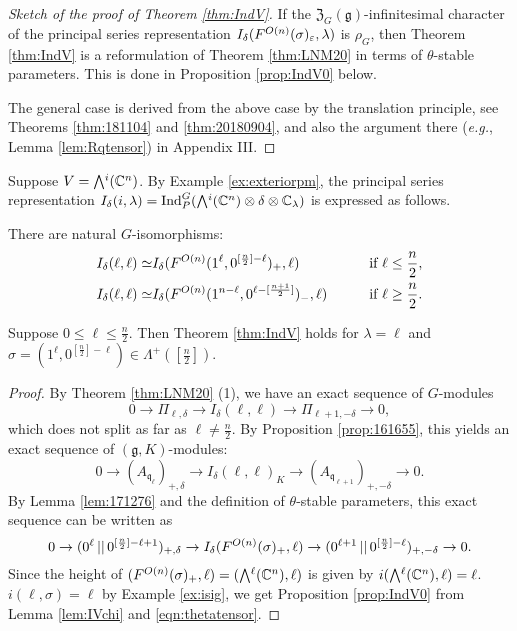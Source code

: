 \begin{proof}
[Sketch of the proof of Theorem \ref{thm:IndV}]
If the ${\mathfrak{Z}}_G({\mathfrak{g}})$-infinitesimal character
 of the principal series representation
 $I_{\delta}(F^{{O(n)}}({\sigma})_{\varepsilon}, \lambda)$ 
 is $\rho_G$, 
 then Theorem \ref{thm:IndV} is a reformulation of Theorem \ref{thm:LNM20}
 in terms of $\theta$-stable parameters.  
This is done in Proposition \ref{prop:IndV0} below.  



The general case is derived from the above case by the translation principle, 
 see Theorems \ref{thm:181104} and \ref{thm:20180904}, 
 and also the argument there
 ({\it{e.g.}}, Lemma \ref{lem:Rqtensor}) in Appendix III.  
\end{proof}
Suppose $V=\Exterior^i({\mathbb{C}}^n)$.  
By Example \ref{ex:exteriorpm}, 
the principal series representation 
 $I_{\delta}(i,\lambda)={\operatorname{Ind}}_P^G(\Exterior^i({\mathbb{C}}^n) \otimes \delta \otimes {\mathbb{C}}_{\lambda})$
 is expressed as follows.  
\begin{lemma}
\label{lem:171276}
There are natural $G$-isomorphisms:
\begin{alignat*}{2}
I_{\delta}(\ell,\ell) 
\simeq & 
I_{\delta}(F^{{O(n)}}({1^\ell, 0^{[\frac n 2]-\ell}})_+,\ell)
&& \text{if $\ell \le \frac n 2$}, 
\\
I_{\delta}(\ell,\ell) 
\simeq & 
I_{\delta}(F^{{O(n)}}({1^{n-\ell}, 0^{\ell-[\frac {n+1} 2]}})_-,\ell)
\qquad
&& \text{if $\ell \ge \frac n 2$}.  
\end{alignat*}
\end{lemma}





\begin{proposition}
\label{prop:IndV0}
Suppose $0 \le \ell \le \frac n 2$.  
Then Theorem \ref{thm:IndV} holds for $\lambda=\ell$ 
 and $\sigma = (1^\ell, 0^{[\frac n 2]-\ell}) \in \Lambda^+([\frac n 2])$.  
\end{proposition}
\begin{proof}
By Theorem \ref{thm:LNM20} (1), 
 we have an exact sequence of $G$-modules
\[
   0 \to \Pi_{\ell,\delta} \to I_{\delta}(\ell,\ell) \to \Pi_{\ell+1,-\delta} \to 0, 
\]
which does not split as far as $\ell \ne \frac n 2$.  
By Proposition \ref{prop:161655}, 
 this yields an exact sequence of $({\mathfrak {g}}, K)$-modules:
\[
  0 \to (A_{{\mathfrak {q}}_\ell})_{+,\delta}
    \to I_{\delta}(\ell,\ell)_K
    \to (A_{{\mathfrak {q}}_{\ell+1}})_{+,-\delta}
    \to 0.  
\]
By Lemma \ref{lem:171276} and the definition of $\theta$-stable parameters,
 this exact sequence can be written as
\[
  0 \to 
  ({0^\ell}\,||\,{0^{[\frac n 2]-\ell+1}})_{+,\delta}
  \to 
  I_{\delta}(F^{{O(n)}}({\sigma})_+,\ell)
  \to
  ({0^{\ell+1}}\,||\,{0^{[\frac n 2]-\ell}})_{+,-\delta}
  \to 0.  
\]
Since the height of $(\Kirredrep{O(n)}{\sigma}_+,\ell)=(\Exterior^{\ell}({\mathbb{C}}^n),\ell)$
 is given by $i(\Exterior^{\ell}({\mathbb{C}}^n),\ell)=\ell$.  
$i(\ell,\sigma)=\ell$ by Example \ref{ex:isig}, 
 we get Proposition \ref{prop:IndV0} from
 Lemma \ref{lem:IVchi} and \eqref{eqn:thetatensor}.  
\end{proof}



